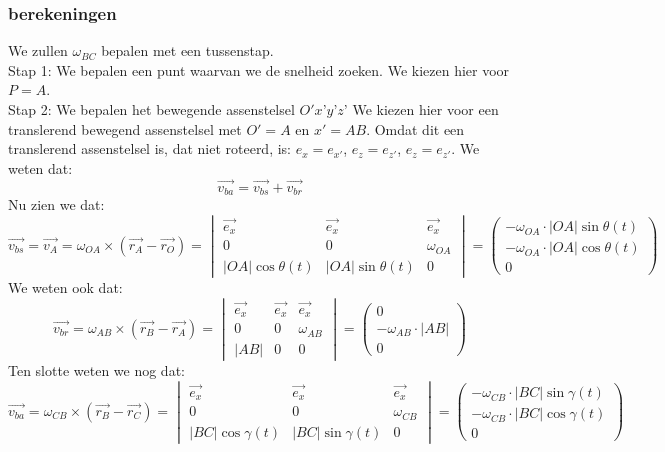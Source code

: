 \documentclass[10pt,a4paper]{article}
\begin{document}
\subsubsection*{berekeningen}
We zullen $\omega_{BC}$ bepalen met een tussenstap.\\
Stap 1: We bepalen een punt waarvan we de snelheid zoeken. We kiezen hier voor $P=A$.\\
Stap 2: We bepalen het bewegende assenstelsel $O'x’y’z’$ We kiezen hier voor een translerend bewegend assenstelsel met $O'=A$ en $x'=AB$. Omdat dit een translerend assenstelsel is, dat niet roteerd, is: $e_{x} = e_{x'}$, $e_{z} = e_{z'}$, $e_{z} = e_{z'}$.
We weten dat:
\[
\vec{v_{ba}} = \vec{v_{bs}} + \vec{v_{br}}
\]
Nu zien we dat:
\[
\vec{v_{bs}} = \vec{v_{A}} = \omega_{OA} \times (\vec{r_{A}} - \vec{r_{O}}) =
\begin{vmatrix}
\vec{e_{x}} & \vec{e_{x}} & \vec{e_{x}}\\
0 & 0 & \omega_{OA}\\
|OA|\cos{\theta(t)} & |OA|\sin{\theta(t)} & 0
\end{vmatrix}
=
\begin{pmatrix}
-\omega_{OA} \cdot |OA|\sin{\theta(t)}\\
-\omega_{OA} \cdot |OA|\cos{\theta(t)}\\
0
\end{pmatrix}
\]
We weten ook dat:
\[
\vec{v_{br}} = \omega_{AB} \times (\vec{r_{B}} - \vec{r_{A}}) =
\begin{vmatrix}
\vec{e_{x}} & \vec{e_{x}} & \vec{e_{x}}\\
0 & 0 & \omega_{AB}\\
|AB| & 0 & 0
\end{vmatrix}
=
\begin{pmatrix}
0\\
-\omega_{AB} \cdot |AB|\\
0
\end{pmatrix}
\]
Ten slotte weten we nog dat:
\[
\vec{v_{ba}} = \omega_{CB} \times (\vec{r_{B}} - \vec{r_{C}}) =
\begin{vmatrix}
\vec{e_{x}} & \vec{e_{x}} & \vec{e_{x}}\\
0 & 0 & \omega_{CB}\\
|BC|\cos{\gamma(t)} & |BC|\sin{\gamma(t)} & 0
\end{vmatrix}
=
\begin{pmatrix}
-\omega_{CB} \cdot |BC|\sin{\gamma(t)}\\
-\omega_{CB} \cdot |BC|\cos{\gamma(t)}\\
0
\end{pmatrix}
\]
\end{document}
